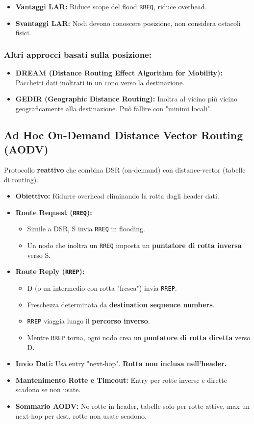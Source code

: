 \begin{itemize}
    \item \textbf{Vantaggi LAR:} Riduce scope del flood \texttt{RREQ}, riduce overhead.
    \item \textbf{Svantaggi LAR:} Nodi devono conoscere posizione, non considera ostacoli fisici.
\end{itemize}

\subsubsection{Altri approcci basati sulla posizione:}
\begin{itemize}
    \item \textbf{DREAM (Distance Routing Effect Algorithm for Mobility):} Pacchetti dati inoltrati in un cono verso la destinazione.
    \item \textbf{GEDIR (Geographic Distance Routing):} Inoltra al vicino più vicino geograficamente alla destinazione. Può fallire con "minimi locali".
\end{itemize}

\subsection{Ad Hoc On-Demand Distance Vector Routing (AODV)}
Protocollo \textbf{reattivo} che combina DSR (on-demand) con distance-vector (tabelle di routing).
\begin{itemize}
    \item \textbf{Obiettivo:} Ridurre overhead eliminando la rotta dagli header dati.
    \item \textbf{Route Request (\texttt{RREQ}):}
    \begin{itemize}
        \item Simile a DSR, S invia \texttt{RREQ} in flooding.
        \item Un nodo che inoltra un \texttt{RREQ} imposta un \textbf{puntatore di rotta inversa} verso S.
    \end{itemize}
    \item \textbf{Route Reply (\texttt{RREP}):}
    \begin{itemize}
        \item D (o un intermedio con rotta "fresca") invia \texttt{RREP}.
        \item Freschezza determinata da \textbf{destination sequence numbers}.
        \item \texttt{RREP} viaggia lungo il \textbf{percorso inverso}.
        \item Mentre \texttt{RREP} torna, ogni nodo crea un \textbf{puntatore di rotta diretta} verso D.
    \end{itemize}
    \item \textbf{Invio Dati:} Usa entry "next-hop". \textbf{Rotta non inclusa nell'header.}
    \item \textbf{Mantenimento Rotte e Timeout:} Entry per rotte inverse e dirette scadono se non usate.
    \item \textbf{Sommario AODV:} No rotte in header, tabelle solo per rotte attive, max un next-hop per dest, rotte non usate scadono.
\end{itemize}

